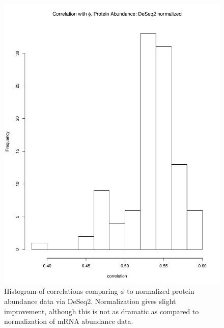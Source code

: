 \documentclass[11pt]{labbook}
\begin{document}
\begin{figure}[H]
\centering
\includegraphics[page=1,scale=0.6]{Ecoli_REL606/correlation_ppr_protein_sf_norm.pdf}
\caption{Histogram of correlations comparing $\phi$ to normalized protein abundance data via DeSeq2. Normalization gives slight improvement, although this is not as dramatic as compared to normalization of mRNA abundance data.}
\end{figure}



{}
\end{document}
